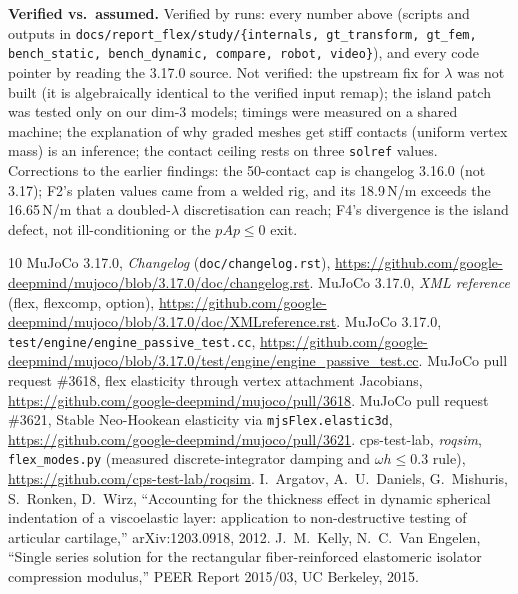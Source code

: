 \documentclass[10pt,twocolumn]{article}
\newcommand{\code}[1]{\texttt{\small #1}}
\newcommand{\Nu}{N/\textmu m}
\begin{document}
\textbf{Verified vs.\ assumed.} Verified by runs: every number above (scripts and outputs in
\code{docs/report\_flex/study/\{internals, gt\_transform, gt\_fem, bench\_static, bench\_dynamic, compare, robot, video\}}), and every
code pointer by reading the 3.17.0 source. Not verified: the upstream fix for $\lambda$ was not built (it is
algebraically identical to the verified input remap); the island patch was tested only on our dim-3 models; timings
were measured on a shared machine; the explanation of why graded meshes get stiff contacts (uniform vertex mass) is an
inference; the contact ceiling rests on three \code{solref} values. Corrections to the earlier findings: the
50-contact cap is changelog 3.16.0 (not 3.17); F2's platen values came from a welded rig, and its 18.9\,\Nu{} exceeds the
16.65\,\Nu{} that a doubled-$\lambda$ discretisation can reach; F4's divergence is the island defect, not
ill-conditioning or the $pAp\le0$ exit.

{\footnotesize
\begin{thebibliography}{10}\setlength{\itemsep}{0pt}
 MuJoCo 3.17.0, \emph{Changelog} (\code{doc/changelog.rst}),
\url{https://github.com/google-deepmind/mujoco/blob/3.17.0/doc/changelog.rst}.
 MuJoCo 3.17.0, \emph{XML reference} (flex, flexcomp, option),
\url{https://github.com/google-deepmind/mujoco/blob/3.17.0/doc/XMLreference.rst}.
 MuJoCo 3.17.0, \code{test/engine/engine\_passive\_test.cc},
\url{https://github.com/google-deepmind/mujoco/blob/3.17.0/test/engine/engine_passive_test.cc}.
 MuJoCo pull request \#3618, flex elasticity through vertex attachment Jacobians,
\url{https://github.com/google-deepmind/mujoco/pull/3618}.
 MuJoCo pull request \#3621, Stable Neo-Hookean elasticity via \code{mjsFlex.elastic3d},
\url{https://github.com/google-deepmind/mujoco/pull/3621}.
 cps-test-lab, \emph{roqsim}, \code{flex\_modes.py} (measured discrete-integrator damping and
$\omega h\le0.3$ rule), \url{https://github.com/cps-test-lab/roqsim}.
 I.~Argatov, A.~U.~Daniels, G.~Mishuris, S.~Ronken, D.~Wirz, ``Accounting for the thickness effect in
dynamic spherical indentation of a viscoelastic layer: application to non-destructive testing of articular
cartilage,'' arXiv:1203.0918, 2012.
 J.~M.~Kelly, N.~C.~Van Engelen, ``Single series solution for the rectangular fiber-reinforced
elastomeric isolator compression modulus,'' PEER Report 2015/03, UC Berkeley, 2015.
\end{thebibliography}}
\end{document}
